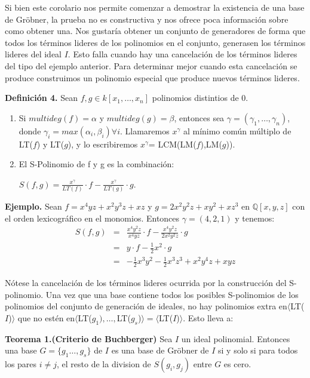 Si bien este corolario nos permite comenzar a demostrar la existencia de una base de Gröbner, la prueba no es constructiva y nos ofrece poca información sobre como obtener una. Nos gustaría obtener un conjunto de generadores de forma que todos los términos lideres de los polinomios en el conjunto, generasen los términos lideres del ideal $I$.  Esto falla cuando hay una cancelación de los términos lideres del tipo del ejemplo anterior.
Para determinar mejor cuando esta cancelación se produce construimos un polinomio especial que produce nuevos términos lideres.

\textbf{Definición 4.} Sean $f,g\in k[x_{1},\dots,x_{n}]$ polinomios distintios de 0.
\begin{enumerate}
	\item Si $multideg(f) = \alpha$ y $multideg(g) = \beta$, entonces sea $\gamma=(\gamma_{1},\dots,\gamma_{n})$, 
	donde $\gamma_{i} = max\left(\alpha_{i},\beta_{i}\right) \forall i$. Llamaremos $x^{\gamma}$ al mínimo común múltiplo de LT($f$) y LT($g$), y lo escribiremos $x^{\gamma}$= LCM(LM($f$),LM($g$)).
	
	\item El S-Polinomio de f y g es la combinación:
	\begin{center}
		$S(f,g) = \frac{x^{\gamma}}{LT(f)}\cdot f- \frac{x^{\gamma}}{LT(g)}\cdot g$.
	\end{center}
\end{enumerate}

\textbf{Ejemplo.} Sean $f = x^{4}yz + x^{2}y^{3}z+xz$ y $g=2x^{2}y^{2}z+xy^{2}+xz^{3}$ en $\mathbb{Q}[x,y,z]$ con el orden lexicográfico en el monomios. Entonces $\gamma=(4,2,1)$ y tenemos:
\begin{eqnarray}
\nonumber S(f,g) &=& \frac{x^{4}y^{2}z}{x^{4}yz}\cdot f - \frac{x^{4}y^{2}z}{2x^{2}y^{2}z}\cdot g \\
\nonumber &=& y \cdot f - \frac{1}{2}x^{2}\cdot g\\
\nonumber &=& -\frac{1}{2}x^{3}y^{2} -\frac{1}{2}x^{3}z^{3} + x^{2}y^{4}z+xyz
\end{eqnarray}

Nótese la cancelación de los términos lideres ocurrida por la construcción del S-polinomio.
Una vez que una base contiene todos los posibles S-polinomios de los polinomios del conjunto de generación de ideales, no hay polinomios extra en$\langle$LT($I$)$\rangle $ que no estén en$\langle$LT($g_{1}),\dots,$LT($g_{s}$)$\rangle = \langle$LT($I$)$\rangle$. Esto lleva a:

\textbf{Teorema 1.(Criterio de Buchberger)} Sea $I$ un ideal polinomial. Entonces una base $G = \lbrace g_{1}\dots,g_{s}\rbrace$ de $I$ es una base de Gröbner de $I$ si y solo si para todos los pares $i\neq j$, el resto de la division de $S(g_{i},g_{j})$ entre $G$ es cero.
 
